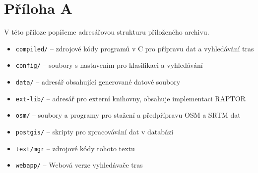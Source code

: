 \chapter*{Příloha A}
V této příloze popíšeme adresářovou strukturu přiloženého archivu.
\begin{itemize}
	\item \verb|compiled/| -- zdrojové kódy programů v C pro přípravu dat a vyhledávání tras
	\item \verb|config/| -- soubory s nastavením pro klasifikaci a vyhledávání
	\item \verb|data/| -- adresář obsahující generované datové soubory
	\item \verb|ext-lib/| -- adresář pro externí knihovny, obsahuje implementaci RAPTOR
	\item \verb|osm/| -- soubory a programy pro stažení a předpřípravu OSM a SRTM dat
	\item \verb|postgis/| -- skripty pro zpracovávání dat v databázi
	\item \verb|text/mgr| -- zdrojové kódy tohoto textu
	\item \verb|webapp/| -- Webová verze vyhledávače tras
\end{itemize}
